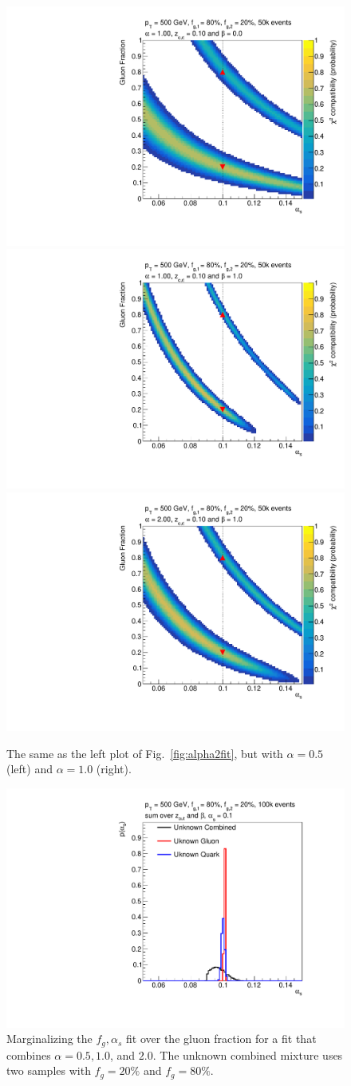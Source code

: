 \begin{figure}[h!]
\begin{center}
\includegraphics[width = 0.49\columnwidth]{figures/banana_alpha_10beta_0_zcut_123451324.pdf}\includegraphics[width = 0.49\columnwidth]{figures/banana_alpha_10beta_10_zcut_123451324.pdf}\\\includegraphics[width = 0.49\columnwidth]{figures/banana_alpha_20beta_10_zcut_123451324.pdf}
\end{center}
\caption{The same as the left plot of Fig.~\ref{fig:alpha2fit}, but with $\alpha=0.5$ (left) and $\alpha=1.0$ (right).}
\label{fig:morebananas}
\end{figure}

\begin{figure}[h!]
\begin{center}
\includegraphics[width = 0.49\columnwidth]{figures/combination23451324.pdf}
\end{center}
\caption{Marginalizing the $f_g,\alpha_s$ fit over the gluon fraction for a fit that combines $\alpha=0.5, 1.0$, and $2.0$.  The unknown combined mixture uses two samples with $f_g=20\%$ and $f_g=80\%$.}
\label{fig:combo}
\end{figure}

